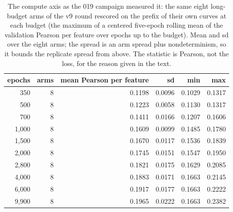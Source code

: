 \begin{table}[htbp]
\centering\footnotesize
\caption{The compute axis as the 019 campaign measured it: the same eight long-budget arms of the v9 round rescored on the prefix of their own curves at each budget (the maximum of a centered five-epoch rolling mean of the validation Pearson per feature over epochs up to the budget). Mean and sd over the eight arms; the spread is an arm spread plus nondeterminism, so it bounds the replicate spread from above. The statistic is Pearson, not the loss, for the reason given in the text.}
\label{tab:budget-curve}
\begin{tabular}{rrrrrr}
\toprule
epochs & arms & mean Pearson per feature & sd & min & max \\
\midrule
350 & 8 & 0.1198 & 0.0096 & 0.1029 & 0.1317 \\
500 & 8 & 0.1223 & 0.0058 & 0.1130 & 0.1317 \\
700 & 8 & 0.1411 & 0.0166 & 0.1207 & 0.1606 \\
1,000 & 8 & 0.1609 & 0.0099 & 0.1485 & 0.1780 \\
1,500 & 8 & 0.1670 & 0.0117 & 0.1536 & 0.1839 \\
2,000 & 8 & 0.1745 & 0.0151 & 0.1547 & 0.1950 \\
2,800 & 8 & 0.1821 & 0.0175 & 0.1629 & 0.2085 \\
4,000 & 8 & 0.1883 & 0.0171 & 0.1663 & 0.2145 \\
6,000 & 8 & 0.1917 & 0.0177 & 0.1663 & 0.2222 \\
9,900 & 8 & 0.1965 & 0.0222 & 0.1663 & 0.2382 \\
\bottomrule
\end{tabular}
\end{table}
